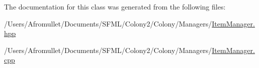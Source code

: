 The documentation for this class was generated from the following files\+:\begin{DoxyCompactItemize}
\item 
/\+Users/\+Afromullet/\+Documents/\+S\+F\+M\+L/\+Colony2/\+Colony/\+Managers/\mbox{\hyperlink{_item_manager_8hpp}{Item\+Manager.\+hpp}}\item 
/\+Users/\+Afromullet/\+Documents/\+S\+F\+M\+L/\+Colony2/\+Colony/\+Managers/\mbox{\hyperlink{_item_manager_8cpp}{Item\+Manager.\+cpp}}\end{DoxyCompactItemize}
